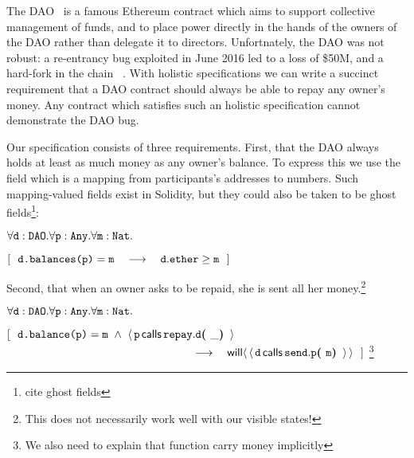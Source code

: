 The DAO~\cite{Dao}  is a famous Ethereum contract  which aims to support
collective management of funds,  and to place power directly in the
hands of the owners of the DAO
rather than delegate it to directors.
Unfortnately, the DAO was not robust:
a re-entrancy bug   exploited in June 2016 led  to a loss of   \$50M, and
a hard-fork in the  chain ~\cite{DaoBug}.
%
With holistic specifications  we can  write a succinct requirement that a
DAO contract should always be able to repay any owner's money.
Any contract which satisfies such an holistic specification cannot demonstrate the DAO bug.
 
Our specification consists of three requirements.
First, that the DAO always holds at least as 
much money as any owner's balance.  To express this we use 
the field  which is a mapping from participants's addresses to 
numbers. Such mapping-valued fields exist in Solidity, but they could
also be taken to be ghost fields\footnote{cite ghost fields}:

\vspace{.1cm}

\noindent
 \strut \hspace{0.5cm} $\forall \prg{d}:\prg{DAO}.\forall \prg{p}:\prg{Any}.\forall\prg{m}:\prg{Nat}.$\\
\strut \hspace{0.5cm} $[\ \ \prg{d.balances(p)}=\prg{m}  \ \ \  \longrightarrow  \ \ \ \prg{d}.\prg{ether}\geq \prg{m} \ \ ] $

\noindent
Second, that when an owner asks to be repaid, she is sent all her money.\footnote{This
does not necessarily work well with our visible states!}
\vspace{.1cm}

\noindent
 \strut \hspace{0.5cm} $\forall \prg{d}:\prg{DAO}.\forall \prg{p}:\prg{Any}.\forall\prg{m}:\prg{Nat}.$\\
\strut \hspace{0.5cm} $[\ \ \prg{d.balance(p)}=\prg{m}
 \ \wedge \ \Calls{\prg{p}}{\prg{d}}{\prg{repay}}{\_}  $\\
 $\strut \hspace{5.5cm}   \ \ \  \longrightarrow  \ \ \  \Future{\Calls{\prg{d}}{\prg{p}}{\prg{send}}{\prg{m}}}\ \ ] $ \footnote{We also need to explain that function carry money implicitly}

